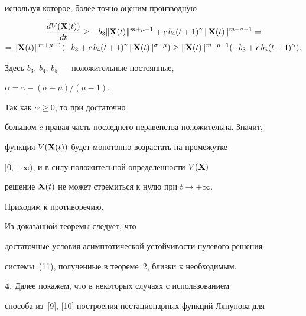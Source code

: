 \begin{pf}
используя которое, более точно оценим производную


\begin{multline*}


\frac{dV(\bold X(t))}{dt} \geq


-b_3 \|\bold X(t)\|^{m+\mu-1}+c \, b_4 (t+1)^\gamma \,


\|\bold X(t)\|^{m+\sigma-1}= \\


%


=\|\bold X(t)\|^{m+\mu-1} (-b_3 +c \, b_4 (t+1)^\gamma \,


\|\bold X(t)\|^{\sigma-\mu})\geq


\|\bold X(t)\|^{m+\mu-1}(-b_3 +c \, b_5 (t+1)^\alpha).


\end{multline*}


Здесь $b_3$, $b_4$, $b_5$ --- положительные постоянные,


$\alpha=\gamma-(\sigma-\mu)/(\mu-1)$.





Так как $\alpha\geq 0$, то при достаточно


большом $c$ правая часть последнего неравенства положительна. Значит,


функция $V(\bold X(t))$ будет монотонно возрастать на промежутке


$[0, +\infty)$, и в силу положительной определенности $V(\bold X)$


решение $\bold X(t)$ не может стремиться к нулю при $t\to +\infty$.


Приходим к противоречию.


\end{pf}





\begin{note}


Из доказанной теоремы следует, что


достаточные условия асимптотической устойчивости нулевого решения


системы~(11), полученные в теореме~2, близки к необходимым.


\end{note}





{\bf 4.} Далее покажем, что в некоторых случаях с использованием


способа из~[9], [10] построения нестационарных функций Ляпунова для


